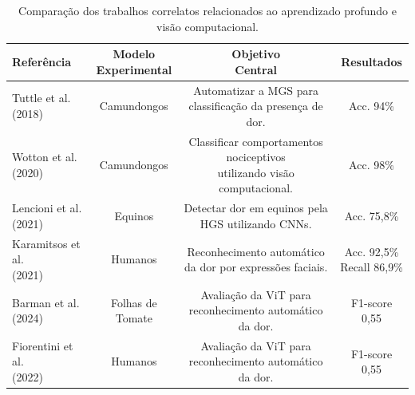 \begin{table}[h]
	\centering
	\footnotesize
	\caption{Comparação dos trabalhos correlatos relacionados ao aprendizado profundo e visão computacional.}
	\label{tab:estado_arte}
	
	\renewcommand{\arraystretch}{1.3}
	
	\begin{tabular}{l|c|c|c}
		
		\toprule
		
		\textbf{Referência} &
		\makecell{\textbf{Modelo}\\ \textbf{Experimental}} &
		\makecell{\textbf{Objetivo}\\ \textbf{Central}} &
		\textbf{Resultados} \\
		
		\midrule
		
		\makecell{Tuttle et al.\\(2018)}&
		Camundongos&
		\makecell{Automatizar a MGS para\\classificação da presença de dor.}&
		Acc. 94\%
		\\
		
		\midrule
		
		\makecell{Wotton et al.\\(2020)}&
		Camundongos&
		\makecell{Classificar comportamentos nociceptivos\\utilizando visão computacional.}&
		Acc. 98\%
		\\
		
		\midrule
		
		\makecell{Lencioni et al.\\(2021)}&
		Equinos&
		\makecell{Detectar dor em equinos pela\\HGS utilizando CNNs.}&
		Acc. 75,8\%
		\\
		
		\midrule
		
		\makecell{Karamitsos et al.\\(2021)}&
		Humanos&
		\makecell{Reconhecimento automático\\da dor por expressões faciais.}&
		\makecell{Acc. 92,5\%\\Recall 86,9\%}
		\\
		
		\midrule
		
		\makecell{Barman et al.\\(2024)}&
		\makecell{Folhas de\\Tomate}&
		\makecell{Avaliação da ViT para\\reconhecimento automático da dor.}&
		F1-score 0,55
		\\
		
		\midrule
		
		\makecell{Fiorentini et al.\\(2022)}&
		Humanos&
		\makecell{Avaliação da ViT para\\reconhecimento automático da dor.}&
		F1-score 0,55
		\\
		
		\bottomrule
		
	\end{tabular}
	
\end{table}

